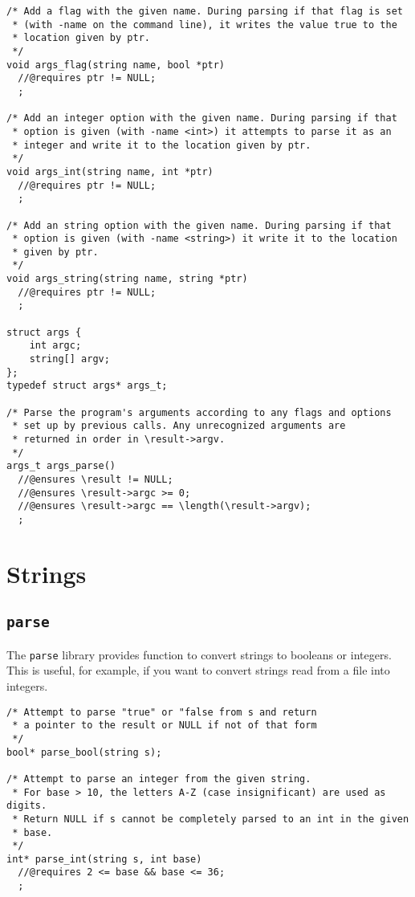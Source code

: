 \documentclass[11pt]{article}
\begin{document}
\begin{small}
\begin{verbatim}
/* Add a flag with the given name. During parsing if that flag is set
 * (with -name on the command line), it writes the value true to the
 * location given by ptr.
 */
void args_flag(string name, bool *ptr)
  //@requires ptr != NULL;
  ;

/* Add an integer option with the given name. During parsing if that
 * option is given (with -name <int>) it attempts to parse it as an
 * integer and write it to the location given by ptr.
 */
void args_int(string name, int *ptr)
  //@requires ptr != NULL;
  ;

/* Add an string option with the given name. During parsing if that
 * option is given (with -name <string>) it write it to the location
 * given by ptr.
 */
void args_string(string name, string *ptr)
  //@requires ptr != NULL;
  ;

struct args {
    int argc;
    string[] argv;
};
typedef struct args* args_t;

/* Parse the program's arguments according to any flags and options
 * set up by previous calls. Any unrecognized arguments are
 * returned in order in \result->argv.
 */
args_t args_parse()
  //@ensures \result != NULL;
  //@ensures \result->argc >= 0;
  //@ensures \result->argc == \length(\result->argv);
  ;
\end{verbatim}
\end{small}

\section{Strings}

\subsection{\tt parse}

The \verb'parse' library provides function to convert
strings to booleans or integers.  This is useful, for
example, if you want to convert strings read from a
file into integers.

\begin{small}
\begin{verbatim}
/* Attempt to parse "true" or "false from s and return
 * a pointer to the result or NULL if not of that form
 */
bool* parse_bool(string s);

/* Attempt to parse an integer from the given string.
 * For base > 10, the letters A-Z (case insignificant) are used as digits.
 * Return NULL if s cannot be completely parsed to an int in the given
 * base.
 */
int* parse_int(string s, int base)
  //@requires 2 <= base && base <= 36;
  ;
\end{verbatim}
\end{small}
\end{document}
